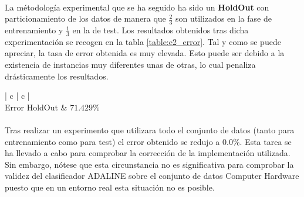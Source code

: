\documentclass{article}
\begin{document}
		\paragraph{}
		La métodología experimental que se ha seguido ha sido un \textbf{HoldOut} con particionamiento de los datos de manera que $\frac{2}{3}$ son utilizados en la fase de entrenamiento y $\frac{1}{3}$ en la de test. Los resultados obtenidos tras dicha experimentación se recogen en la tabla \ref{table:e2_error}. Tal y como se puede apreciar, la tasa de error obtenida es muy elevada. Esto puede ser debido a la existencia de instancias muy diferentes unas de otras, lo cual penaliza drásticamente los resultados.


		\begin{table}[h]
			\centering
			\small
			\begin{tabu}{ | c | c | }
				\hline
				 \\ \hline
				Error HoldOut & $71.429\%$	 \\
				\hline
			\end{tabu}
			\caption{[TODO ]}
			\label{table:e2_error}
		\end{table}

		\paragraph{}
		Tras realizar un experimento que utilizara todo el conjunto de datos (tanto para entrenamiento como para test) el error obtenido se redujo a $0.0\%$. Esta tarea se ha llevado a cabo para comprobar la corrección de la implementación utilizada. Sin embargo, nótese que esta circunstancia no es significativa para comprobar la validez del clasificador ADALINE sobre el conjunto de datos Computer Hardware puesto que en un entorno real esta situación no es posible.



	\nocite{subject:taa}
  
  
\end{document}
